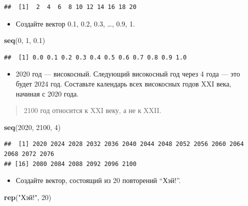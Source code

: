 \documentclass[]{book}
\newenvironment{Shaded}{\begin{snugshade}}{\end{snugshade}}
\newcommand{\KeywordTok}[1]{\textcolor[rgb]{0.13,0.29,0.53}{\textbf{#1}}}
\newcommand{\DecValTok}[1]{\textcolor[rgb]{0.00,0.00,0.81}{#1}}
\newcommand{\FloatTok}[1]{\textcolor[rgb]{0.00,0.00,0.81}{#1}}
\newcommand{\StringTok}[1]{\textcolor[rgb]{0.31,0.60,0.02}{#1}}
\newcommand{\NormalTok}[1]{#1}
\providecommand{\tightlist}{%
  \setlength{\itemsep}{0pt}\setlength{\parskip}{0pt}}
\begin{document}
\begin{verbatim}
##  [1]  2  4  6  8 10 12 14 16 18 20
\end{verbatim}

\begin{itemize}
\tightlist
\item
  Создайте вектор 0.1, 0.2, 0.3, \ldots{}, 0.9, 1.
\end{itemize}

\begin{Shaded}
\begin{Highlighting}[]
\KeywordTok{seq}\NormalTok{(}\DecValTok{0}\NormalTok{, }\DecValTok{1}\NormalTok{, }\FloatTok{0.1}\NormalTok{)}
\end{Highlighting}
\end{Shaded}

\begin{verbatim}
##  [1] 0.0 0.1 0.2 0.3 0.4 0.5 0.6 0.7 0.8 0.9 1.0
\end{verbatim}

\begin{itemize}
\tightlist
\item
  2020 год --- високосный. Следующий високосный год через 4 года --- это
  будет 2024 год. Составьте календарь всех високосных годов XXI века,
  начиная с 2020 года.
\end{itemize}

\begin{quote}
2100 год относится к XXI веку, а не к XXII.
\end{quote}

\begin{Shaded}
\begin{Highlighting}[]
\KeywordTok{seq}\NormalTok{(}\DecValTok{2020}\NormalTok{, }\DecValTok{2100}\NormalTok{, }\DecValTok{4}\NormalTok{)}
\end{Highlighting}
\end{Shaded}

\begin{verbatim}
##  [1] 2020 2024 2028 2032 2036 2040 2044 2048 2052 2056 2060 2064 2068 2072 2076
## [16] 2080 2084 2088 2092 2096 2100
\end{verbatim}

\begin{itemize}
\tightlist
\item
  Создайте вектор, состоящий из 20 повторений ``Хэй!''.
\end{itemize}

\begin{Shaded}
\begin{Highlighting}[]
\KeywordTok{rep}\NormalTok{(}\StringTok{"Хэй!"}\NormalTok{, }\DecValTok{20}\NormalTok{)}
\end{Highlighting}
\end{Shaded}
\end{document}
